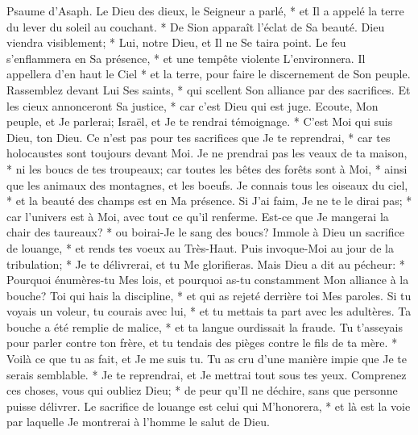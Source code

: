 Psaume d'Asaph. Le Dieu des dieux, le Seigneur a parlé, * et Il a appelé la terre du lever du soleil au couchant. *
De Sion apparaît l'éclat de Sa beauté.
Dieu viendra visiblement; * Lui, notre Dieu, et Il ne Se taira point. Le feu s'enflammera en Sa présence, * et une tempête violente L'environnera.
Il appellera d'en haut le Ciel * et la terre, pour faire le discernement de Son peuple.
Rassemblez devant Lui Ses saints, * qui scellent Son alliance par des sacrifices.
Et les cieux annonceront Sa justice, * car c'est Dieu qui est juge.
Ecoute, Mon peuple, et Je parlerai; Israël, et Je te rendrai témoignage. * C'est Moi qui suis Dieu, ton Dieu.
Ce n'est pas pour tes sacrifices que Je te reprendrai, * car tes holocaustes sont toujours devant Moi.
Je ne prendrai pas les veaux de ta maison, * ni les boucs de tes troupeaux;
car toutes les bêtes des forêts sont à Moi, * ainsi que les animaux des montagnes, et les boeufs.
Je connais tous les oiseaux du ciel, * et la beauté des champs est en Ma présence.
Si J'ai faim, Je ne te le dirai pas; * car l'univers est à Moi, avec tout ce qu'il renferme.
Est-ce que Je mangerai la chair des taureaux? * ou boirai-Je le sang des boucs?
Immole à Dieu un sacrifice de louange, * et rends tes voeux au Très-Haut.
Puis invoque-Moi au jour de la tribulation; * Je te délivrerai, et tu Me glorifieras.
Mais Dieu a dit au pécheur: * Pourquoi énumères-tu Mes lois, et pourquoi as-tu constamment Mon alliance à la bouche?
Toi qui hais la discipline, * et qui as rejeté derrière toi Mes paroles.
Si tu voyais un voleur, tu courais avec lui, * et tu mettais ta part avec les adultères.
Ta bouche a été remplie de malice, * et ta langue ourdissait la fraude.
Tu t'asseyais pour parler contre ton frère, et tu tendais des pièges contre le fils de ta mère. *
Voilà ce que tu as fait, et Je me suis tu. Tu as cru d'une manière impie que Je te serais semblable. * Je te reprendrai, et Je mettrai tout sous tes yeux.
Comprenez ces choses, vous qui oubliez Dieu; * de peur qu'Il ne déchire, sans que personne puisse délivrer.
Le sacrifice de louange est celui qui M'honorera, * et là est la voie par laquelle Je montrerai à l'homme le salut de Dieu.

